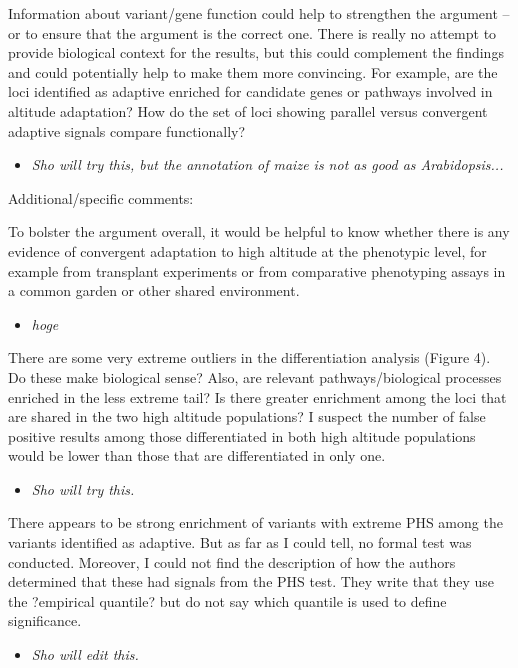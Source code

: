 \documentclass[onecolumn,oneside,letterpaper]{article}
\begin{document}
Information about variant/gene function could help to strengthen the argument -- or to ensure that the argument is the correct one.  There is really no attempt to provide biological context for the results, but this could complement the findings and could potentially help to make them more convincing.  For example, are the loci identified as adaptive enriched for candidate genes or pathways involved in altitude adaptation? How do the set of loci showing parallel versus convergent adaptive signals compare functionally?   
\setlength{\parskip}{-5.0pt}
\begin{itemize}
\item \textit{ Sho will try this, but the annotation of maize is not as good as Arabidopsis... }
\end{itemize}
\setlength{\parskip}{10.0pt}

Additional/specific comments:  

To bolster the argument overall, it would be helpful to know whether there is any evidence of convergent adaptation to high altitude at the phenotypic level, for example from transplant experiments or from comparative phenotyping assays in a common garden or other shared environment.  
\setlength{\parskip}{-5.0pt}
\begin{itemize}
\item \textit{ hoge }
\end{itemize}
\setlength{\parskip}{10.0pt}

There are some very extreme outliers in the differentiation analysis (Figure 4). Do these make biological sense? Also, are relevant pathways/biological processes enriched in the less extreme tail?  Is there greater enrichment among the loci that are shared in the two high altitude populations? I suspect the number of false positive results among those differentiated in both high altitude populations would be lower than those that are differentiated in only one.  
\setlength{\parskip}{-5.0pt}
\begin{itemize}
\item \textit{ Sho will try this. }
\end{itemize}
\setlength{\parskip}{10.0pt}

There appears to be strong enrichment of variants with extreme PHS among the variants identified as adaptive. But as far as I could tell, no formal test was conducted. Moreover, I could not find the description of how the authors determined that these had signals from the PHS test. They write that they use the ?empirical quantile? but do not say which quantile is used to define significance.  
\setlength{\parskip}{-5.0pt}
\begin{itemize}
\item \textit{ Sho will edit this. }
\end{itemize}
\setlength{\parskip}{10.0pt}
\end{document}
